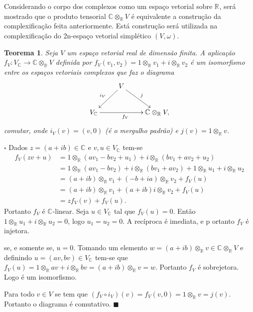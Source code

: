 \documentclass[12pt]{book}
\newtheorem{teorema}{Teorema}[section]
\newenvironment{prova}[1]{$\square$ #1}{\hfill$\blacksquare$}
\newcommand{\complexificacao}[1]{#1_{\complexo{}}}
\newcommand{\complexificacaotensorial}[1]{\complexo{}\otimes_{\reta} #1}
\newcommand{\complexificacaoelemento}[2]{#1\otimes_{\reta} #2}
\newcommand{\complexo}[1]{\mathbb{C}^{#1}}
\newcommand{\real}[1]{\mathbb{R}^{#1}}
\newcommand{\reta}{\real{}}
\begin{document}
	Considerando o corpo dos complexos como um espaço vetorial sobre $\reta$, será mostrado que o produto tensorial $\complexificacaotensorial{V}$ é equivalente a construção da complexificação feita anteriormente. Está construção será utilizada na complexificação do 2n-espaço vetorial simplético $(V, \omega)$.
	
	\begin{teorema}\label{teorema_isomorfismo_complexificacao}
		Seja $V$ um espaço vetorial real de dimensão finita. A aplicação $f_{V}: \complexificacao{V} \to \complexificacaotensorial{V}$ definida por  $f_{V}(v_{1},v_{2}) = 1\otimes_{\reta} v_{1} + i \otimes_{\reta} v_{2}$ é um isomorfismo entre os espaços vetoriais complexos que faz o diagrama
		$$
		\xymatrix{
			& V\ar[dl]_{i_{V}}\ar[rd]^{j} &
			\\
			\complexificacao{V}\ar[rr]_{f_{V}}& & \complexificacaotensorial{V},
		}
		$$
		comutar, onde $i_{V}(v) = (v,0)$ (é o mergulho padrão) e $j(v) = 1\otimes_{\reta} v$.
	\end{teorema}
	\begin{prova}
		Dados $z=(a+ib) \in \complexo{}$ e $v,u \in \complexificacao{V}$ tem-se
		$$
		\begin{aligned}
		f_{V}(zv+u) &= 1\otimes_{\reta} (a v_{1} - bv_{2} + u_{1}) + i \otimes_{\reta} (bv_{1}+av_{2} + u_{2})
		\\
		&=1\otimes_{\reta} (a v_{1} - bv_{2}) + i \otimes_{\reta} (bv_{1}+av_{2})+1\otimes_{\reta} u_{1} + i \otimes_{\reta} u_{2}
		\\
		&=(a+ib)\otimes_{\reta}v_{1} + (-b+ia)\otimes_{\reta} v_{2}+f_{V}(u)
		\\
		&=(a+ib)\otimes_{\reta}v_{1} + (a+ib)i\otimes_{\reta} v_{2}+f_{V}(u)
		\\
		&=zf_{V}(v)+f_{V}(u).
		\end{aligned}
		$$
		Portanto $f_{V}$ é $\complexo{}$-linear. Seja $u \in \complexificacao{V}$ tal que $f_{V}(u) = 0$. Então $1\otimes_{\reta}u_{1}+i\otimes_{\reta} u_{2}=0$, logo $u_{1}=u_{2}=0$. A recíproca é imediata, e p
		ortanto $f_{V}$ é injetora.
		
		
		 se, e somente se, $u = 0$. Tomando um elemento $w = (a+ib)\otimes_{\reta}v \in \complexificacaotensorial{V} $ e definindo $u = (av, bv) \in \complexificacao{V}$ tem-se que $f_{V}(u) = \complexificacaoelemento{1}{av} +\complexificacaoelemento{i}{bv} = (a+ib)\otimes_{\reta} v = w$. Portanto $f_{V}$ é sobrejetora. Logo é um isomorfismo.
		
		Para todo $v \in V$ se tem que $(f_{V}\circ i_{V})(v) = f_{V}(v, 0) = 1\otimes_{\reta} v = j(v)$. Portanto o diagrama é comutativo.
	\end{prova}
	
\end{document}
